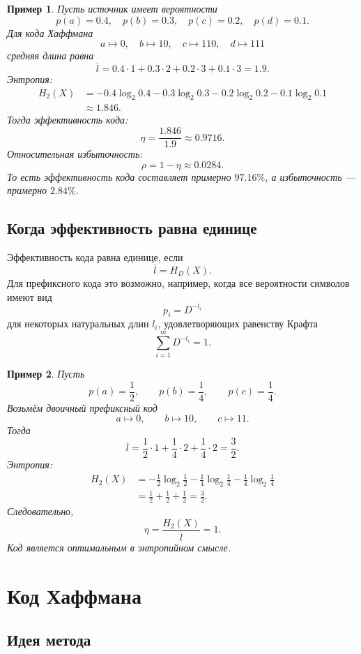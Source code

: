 \documentclass[12pt,a4paper]{article}
\newtheorem{example}{Пример}[section]
\begin{document}
\begin{example}
Пусть источник имеет вероятности
\[
    p(a)=0.4,\quad p(b)=0.3,\quad p(c)=0.2,\quad p(d)=0.1.
\]
Для кода Хаффмана
\[
    a\mapsto 0,\quad
    b\mapsto 10,\quad
    c\mapsto 110,\quad
    d\mapsto 111
\]
средняя длина равна
\[
    \overline l
    =
    0.4\cdot 1+0.3\cdot 2+0.2\cdot 3+0.1\cdot 3
    =
    1.9.
\]
Энтропия:
\[
\begin{aligned}
H_2(X)
&=
-0.4\log_2 0.4
-0.3\log_2 0.3
-0.2\log_2 0.2
-0.1\log_2 0.1\\
&\approx 1.846.
\end{aligned}
\]
Тогда эффективность кода:
\[
    \eta=\frac{1.846}{1.9}\approx 0.9716.
\]
Относительная избыточность:
\[
    \rho=1-\eta\approx 0.0284.
\]
То есть эффективность кода составляет примерно $97.16\%$, а избыточность --- примерно $2.84\%$.
\end{example}

\subsection{Когда эффективность равна единице}

Эффективность кода равна единице, если
\[
    \overline l = H_D(X).
\]
Для префиксного кода это возможно, например, когда все вероятности символов имеют вид
\[
    p_i=D^{-l_i}
\]
для некоторых натуральных длин $l_i$, удовлетворяющих равенству Крафта
\[
    \sum_{i=1}^{m}D^{-l_i}=1.
\]

\begin{example}
Пусть
\[
    p(a)=\frac12,\qquad
    p(b)=\frac14,\qquad
    p(c)=\frac14.
\]
Возьмём двоичный префиксный код
\[
    a\mapsto 0,\qquad
    b\mapsto 10,\qquad
    c\mapsto 11.
\]
Тогда
\[
    \overline l
    =
    \frac12\cdot 1+\frac14\cdot 2+\frac14\cdot 2
    =
    \frac32.
\]
Энтропия:
\[
\begin{aligned}
H_2(X)
&=
-\frac12\log_2\frac12
-\frac14\log_2\frac14
-\frac14\log_2\frac14\\
&=
\frac12+ \frac12+\frac12
=
\frac32.
\end{aligned}
\]
Следовательно,
\[
    \eta=\frac{H_2(X)}{\overline l}=1.
\]
Код является оптимальным в энтропийном смысле.
\end{example}

\section{Код Хаффмана}

\subsection{Идея метода}
\end{document}
